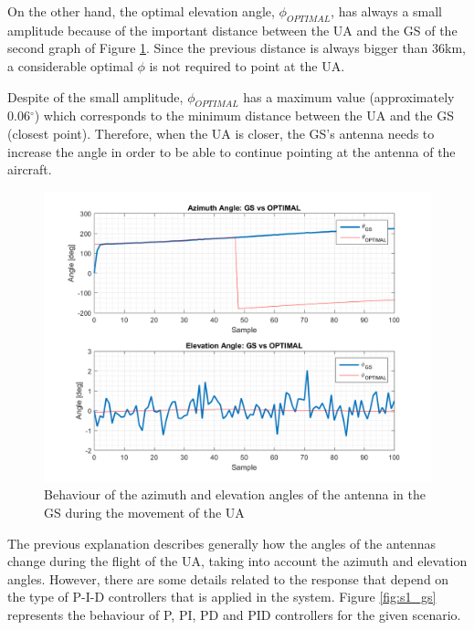 On the other hand, the optimal elevation angle, $\phi_{OPTIMAL}$, has always a small amplitude because of the important distance between the UA and the GS of the second graph of Figure \ref{fig:s1_pd_gs_alone}. Since the previous distance is always bigger than 36km, a considerable optimal $\phi$ is not required to point at the UA. 

Despite of the small amplitude, $\phi_{OPTIMAL}$ has a maximum value (approximately 0.06$^{\circ}$) which corresponds to the minimum distance between the UA and the GS (closest point). Therefore, when the UA is closer, the GS’s antenna needs to increase the angle in order to be able to continue pointing at the antenna of the aircraft.

\begin{figure}[H]
	\centering
	\includegraphics[scale=0.75]{figures/s1_pd_gs.png}
	\caption{Behaviour of the azimuth and elevation angles of the antenna in the GS during the movement of the UA}
	\label{fig:s1_pd_gs_alone}
\end{figure}

The previous explanation describes generally how the angles of the antennas change during the flight of the UA, taking into account the azimuth and elevation angles. However, there are some details related to the response that depend on the type of P-I-D controllers that is applied in the system. Figure \ref{fig:s1_gs} represents the behaviour of P, PI, PD and PID controllers for the given scenario.

